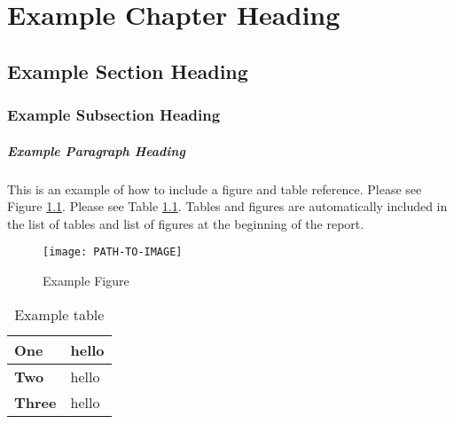 \chapter{Example Chapter Heading}
\section{Example Section Heading}




\subsection{Example Subsection Heading}
\blindtext
{}

\paragraph{Example Paragraph Heading}
This is an example of how to include a figure and table reference. Please see Figure \ref{fig:my_label}. Please see Table \ref{table:my_label}. Tables and figures are automatically included in the list of tables and list of figures at the beginning of the report.


\begin{figure}
    \centering
    \texttt{[image: PATH-TO-IMAGE]}
    \caption{Example Figure}
    \label{fig:my_label}
\end{figure}




\begin{table}[H]
\centering
\caption{Example table}
\label{table:my_label}
\begin{tabular}{|
>{\raggedright\arraybackslash}p{}|
>{\raggedright\arraybackslash}p{}|
}
    \hline
     \textbf{One} & hello
     \\\hline
     \textbf{Two} & hello
     \\\hline
     \textbf{Three} & hello
     \\\hline
\end{tabular}
\end{table}

